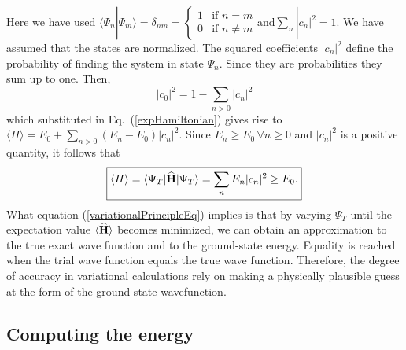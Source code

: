 Here 
we have used $\langle\Psi_n|\Psi_m\rangle = \delta_{nm} = \begin{cases} 
1 & \text{if } n = m\\
0 & \text{if } n \neq m
\end{cases} \text{and} \sum\limits_{n} |c_n|^2 = 1.$ 
We have assumed that the states are normalized.
The squared coefficients $|c_n|^2$ define the probability of finding the system in state $\Psi_n$. Since they are probabilities they sum up to one. Then, 
$$|c_0|^2 = 1 - \sum\limits_{n>0} |c_n|^2$$
which substituted in Eq.~(\ref{expHamiltonian}) gives rise to $\langle H \rangle = E_0 + \sum_{n>0}(E_n - E_0)|c_n|^2$. Since $E_n \geq E_0 \, \forall n \geq 0$ and $|c_n|^2$ is a positive quantity, it follows that
\begin{equation}\label{variationalPrincipleEq}
\boxed{\langle H \rangle = \langle{\Psi_T}|{\bf\widehat{H}}|{\Psi_T}\rangle = \sum\limits_{n} E_n |c_n|^2 \geq E_0.}
\end{equation}
What equation (\ref{variationalPrincipleEq}) implies is that by varying $\Psi_T$ until the expectation value $\langle {\bf\widehat{H}} \rangle$ becomes minimized, we can obtain an approximation to the true exact wave function and to the ground-state energy. Equality is reached when the trial wave function equals the true wave function. Therefore, the degree of accuracy in variational calculations rely on making a physically plausible guess at the form of the ground state wavefunction.

\subsection{Computing the energy}

